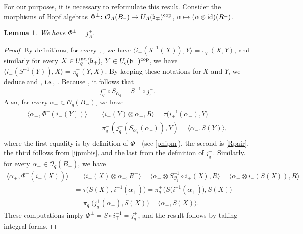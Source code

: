 \documentclass[10pt,a4paper]{amsart}
\numberwithin{equation}{section}
\newtheorem{lem}[teo]{Lemma}
\theoremstyle{definition}
\newcommand{\Oq}{\Oo_{q}}
\newcommand{\Oo}{{\mathcal O}}
\newcommand{\ra}{\rightarrow}
\begin{document}
For our purposes, it is necessary to reformulate this result. Consider the morphisms of Hopf algebras $\Phi^\pm\colon \Oo_A(B_\pm) \ra U_A(\mathfrak{b}_\mp)^{\rm cop}$, $\alpha\mapsto (\alpha \otimes {\rm id})(R^\pm)$.
\begin{lem}\label{Phij} We have $\Phi^\pm = j_A^\pm$.
\end{lem}
\begin{proof} By definitions, for every , , we have $\langle i_+(S^{-1}(X)), Y\rangle = \pi_q^-(X,Y)$, and similarly for every $X\in U_q^{\rm ad}(\mathfrak{b}_+)$, $Y\in U_q(\mathfrak{b}_-)^{\rm cop}$, we have $\langle i_-(S^{-1}(Y)), X\rangle = \pi_q^+(Y,X)$. By keeping these notations for $X$ and $Y$, we deduce  and , i.e., .
Because \smash{$S_{\Oq}^{-1} \circ i_\pm = i_\pm \circ S$}, it follows that
\begin{equation}\label{ijpmbis}
j_q^\pm\circ S_{\Oq} = S^{-1}\circ j_q^\pm .
\end{equation}
Also, for every $\alpha_-\in \Oo_q(B_-)$, we have
\begin{gather*}
\begin{split}
\big\langle \alpha_-, \Phi^+(i_-(Y))\big\rangle &= \langle i_-(Y) \otimes \alpha_-,R\rangle = \tau\big( i_+^{-1}(\alpha_-), Y\big)\\
& =
 \pi^-_q(j_q^-(S_{\Oq}(\alpha_-)),Y) = \langle \alpha_-,S(Y)\rangle,
\end{split}
\end{gather*}
where the first equality is by definition of $\Phi^+$ (see \eqref{phipm}), the second is \eqref{Rpair}, the third follows from \eqref{ijpmbis}, and the last from the definition of $j_q^-$. Similarly, for every $\alpha_+\in \Oo_q(B_+)$, we have
\begin{align*}
\langle \alpha_+, \Phi^-(i_+(X))\rangle & = \langle i_+(X) \otimes \alpha_+,R^-\rangle = \big\langle \alpha_+ \otimes S_{\Oq}^{-1}\circ i_+(X) , R\big\rangle = \langle \alpha_+ \otimes i_+(S(X)), R\rangle \\
& = \tau\big( S(X), i_-^{-1}(\alpha_+)\big) = \pi^+_q\big(S\big(i_-^{-1}(\alpha_+)\big), S(X)\big)\\
&= \pi^+_q\big(j_q^+(\alpha_+), S(X)\big) = \langle \alpha_+,S(X)\rangle.
\end{align*}
These computations imply $\Phi^\pm = S\circ i_\mp^{-1} = j_q^\pm$, and the result follows by taking integral forms.
\end{proof}
\end{document}
